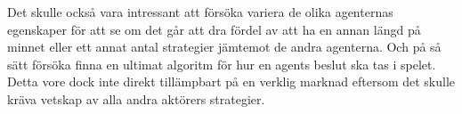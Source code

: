 Det skulle också vara intressant att försöka variera de olika agenternas egenskaper för att se om det går att dra fördel av att ha en annan längd på minnet eller ett annat antal strategier jämtemot de andra agenterna. Och på så sätt försöka finna en ultimat algoritm för hur en agents beslut ska tas i spelet. Detta vore dock inte direkt tillämpbart på en verklig marknad eftersom det skulle kräva vetskap av alla andra aktörers strategier. %




